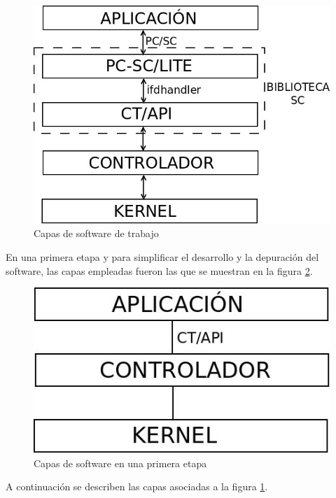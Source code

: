 \begin{figure}[H]
\centering
  \begin{center}
  \includegraphics[scale=.4]{Imagenes/SW_sc1.jpg} 
  \end{center}
  \caption{Capas de software de trabajo}\label{Fig:capas} 
\end{figure}

\bigskip
En una primera etapa y para simplificar el desarrollo y la depuración del software, las capas empleadas fueron las que se muestran en la figura \ref{Fig:capas0}.


\begin{figure}[H]
\centering
  \begin{center}
  \includegraphics[scale=.4]{Imagenes/SW_sc2.jpg} 
  \end{center}
  \caption{Capas de software en una primera etapa}\label{Fig:capas0} 
\end{figure}

\bigskip
A continuación se describen las capas asociadas a la figura \ref{Fig:capas}.

